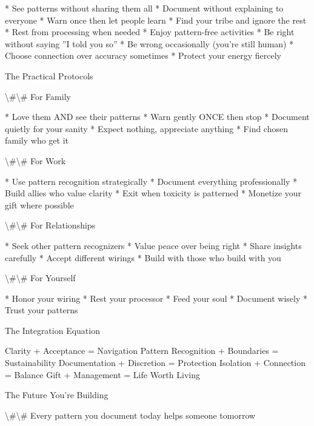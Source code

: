 \documentclass[12pt,oneside]{book}
\begin{document}
                    * See patterns without sharing them all
                    * Document without explaining to everyone
                    * Warn once then let people learn
                    * Find your tribe and ignore the rest
                    * Rest from processing when needed
                    * Enjoy pattern-free activities
                    * Be right without saying ''I told you so''
                    * Be wrong occasionally (you're still human)
                    * Choose connection over accuracy sometimes
                    * Protect your energy fiercely

The Practical Protocols

\textbackslash{}#\textbackslash{}# For Family

                    * Love them AND see their patterns
                    * Warn gently ONCE then stop
                    * Document quietly for your sanity
                    * Expect nothing, appreciate anything
                    * Find chosen family who get it

\textbackslash{}#\textbackslash{}# For Work

                    * Use pattern recognition strategically
                    * Document everything professionally
                    * Build allies who value clarity
                    * Exit when toxicity is patterned
                    * Monetize your gift where possible

\textbackslash{}#\textbackslash{}# For Relationships

                    * Seek other pattern recognizers
                    * Value peace over being right
                    * Share insights carefully
                    * Accept different wirings
                    * Build with those who build with you

\textbackslash{}#\textbackslash{}# For Yourself

                    * Honor your wiring
                    * Rest your processor
                    * Feed your soul
                    * Document wisely
                    * Trust your patterns

The Integration Equation

Clarity + Acceptance = Navigation Pattern Recognition + Boundaries = Sustainability Documentation + Discretion = Protection Isolation + Connection = Balance Gift + Management = Life Worth Living

The Future You're Building

\textbackslash{}#\textbackslash{}# Every pattern you document today helps someone tomorrow
\end{document}
